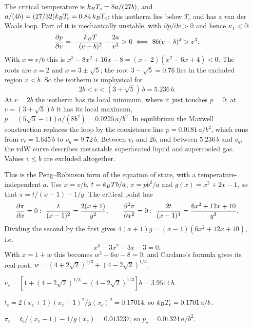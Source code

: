 The critical temperature is $k_{B} T_c = 8a/(27b)$, and $a/(4b) = (27/32)k_{B} T_c = 0.84\,k_{B} T_c$: this isotherm lies
below $T_c$ and has a van der Waals loop. Part of it is mechanically unstable, with $\partial p/\partial v>0$ and hence
$\kappa_T<0$:
\begin{equation}
  \frac{\partial p}{\partial v} = -\frac{k_{B} T}{(v-b)^2}+\frac{2a}{v^3}>0\iff 8b(v-b)^2>v^3 .
\end{equation}
With $x = v/b$ this is $x^3-8x^2+16x-8 = (x-2)(x^2-6x+4)<0$. The roots are $x = 2$ and $x = 3\pm\sqrt5$; the root
$3-\sqrt5 = 0.76$ lies in the excluded region $v<b$. So the isotherm is unphysical for
\begin{equation}
  2b<v<(3+\sqrt5)\,b = 5.236\,b .
\end{equation}
At $v = 2b$ the isotherm has its local minimum, where it just touches $p = 0$; at $v = (3+\sqrt5)b$ it has its local
maximum, $p = (5\sqrt5-11)a/(8b^2) = 0.0225\,a/b^2$. In equilibrium the Maxwell construction replaces the loop by the
coexistence line $p = 0.0181\,a/b^2$, which runs from $v_\ell = 1.645\,b$ to $v_g = 9.72\,b$. Between $v_\ell$ and $2b$,
and between $5.236\,b$ and $v_g$, the vdW curve describes metastable superheated liquid and supercooled gas. Values
$v\le b$ are excluded altogether.

This is the Peng--Robinson form of the equation of state, with a temperature-independent $a$. Use $x = v/b$,
$t = k_{B} Tb/a$, $\pi = pb^2/a$ and $g(x) = x^2+2x-1$, so that $\pi = t/(x-1)-1/g$. The critical point has
\begin{equation}
  \pder{\pi}{x} = 0:\ \frac{t}{(x-1)^2} = \frac{2(x+1)}{g^2},\qquad
  \frac{\partial^2\pi}{\partial x^2} = 0:\ \frac{2t}{(x-1)^3} = \frac{6x^2+12x+10}{g^3}.
\end{equation}
Dividing the second by the first gives $4(x+1)g = (x-1)(6x^2+12x+10)$, i.e.
\begin{equation}
  x^3-3x^2-3x-3 = 0 .
\end{equation}
With $x = 1+w$ this becomes $w^3-6w-8 = 0$, and Cardano's formula gives its real root,
$w = (4+2\sqrt2)^{1/3}+(4-2\sqrt2)^{1/3}$.

 $v_c = \left[1+(4+2\sqrt2)^{1/3}+(4-2\sqrt2)^{1/3}\right]b = 3.9514\,b$.

 $t_c = 2(x_c+1)(x_c-1)^2/g(x_c)^2 = 0.17014$, so $k_{B} T_c = 0.1701\,a/b$.

 $\pi_c = t_c/(x_c-1)-1/g(x_c) = 0.013237$, so $p_c = 0.01324\,a/b^2$.

